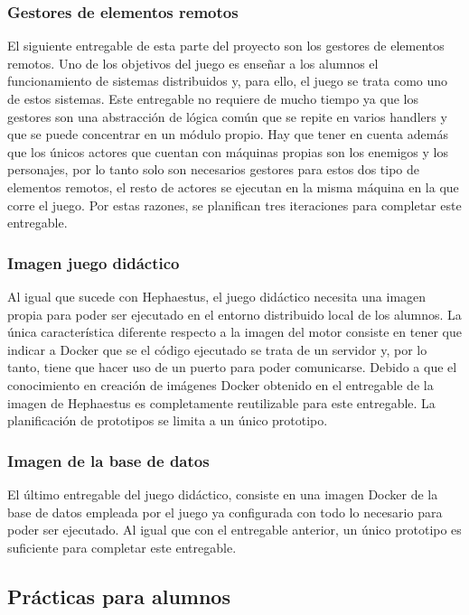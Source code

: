 \subsubsection{Gestores de elementos remotos}

El siguiente entregable de esta parte del proyecto son los gestores de elementos remotos. Uno de los objetivos del juego es enseñar a los alumnos el funcionamiento de sistemas distribuidos y, para ello, el juego se trata como uno de estos sistemas. Este entregable no requiere de mucho tiempo ya que los gestores son una abstracción de lógica común que se repite en varios handlers y que se puede concentrar en un módulo propio. Hay que tener en cuenta además que los únicos actores que cuentan con máquinas propias son los enemigos y los personajes, por lo tanto solo son necesarios gestores para estos dos tipo de elementos remotos, el resto de actores se ejecutan en la misma máquina en la que corre el juego. Por estas razones, se planifican tres iteraciones para completar este entregable.

\subsubsection{Imagen juego didáctico}

Al igual que sucede con Hephaestus, el juego didáctico necesita una imagen propia para poder ser ejecutado en el entorno distribuido local de los alumnos. La única característica diferente respecto a la imagen del motor consiste en tener que indicar a Docker que se el código ejecutado se trata de un servidor y, por lo tanto, tiene que hacer uso de un puerto para poder comunicarse. Debido a que el conocimiento en creación de imágenes Docker obtenido en el entregable de la imagen de Hephaestus es completamente reutilizable para este entregable. La planificación de prototipos se limita a un único prototipo.

\subsubsection{Imagen de la base de datos}

El último entregable del juego didáctico, consiste en una imagen Docker de la base de datos empleada por el juego ya configurada con todo lo necesario para poder ser ejecutado. Al igual que con el entregable anterior, un único prototipo es suficiente para completar este entregable.

\subsection{Prácticas para alumnos}

